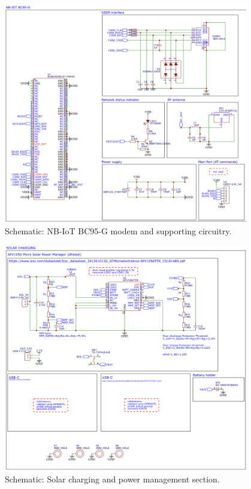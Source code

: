 \documentclass[11pt,a4paper]{article}
\begin{document}
\begin{figure}[h]
    \centering
    \includegraphics[width=0.95\textwidth]{tex_photos/schematic_nbiot.png}
    \caption{Schematic: NB-IoT BC95-G modem and supporting circuitry.}
    \label{fig:schematic-nbiot}
\end{figure}

\begin{figure}[h]
    \centering
    \includegraphics[width=0.95\textwidth]{tex_photos/schematic_solarcharging.png}
    \caption{Schematic: Solar charging and power management section.}
    \label{fig:schematic-solarcharging}
\end{figure}
\end{document}
